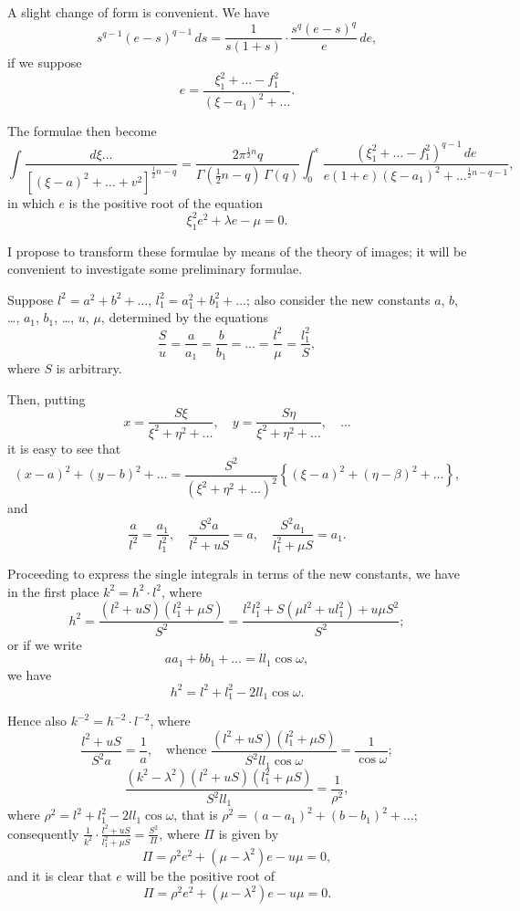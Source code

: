 \documentclass[11pt,a4paper]{book}
\begin{document}
A slight change of form is convenient. We have
\[s^{q-1}(e-s)^{q-1}\,ds = \frac{1}{s(1+s)} \cdot \frac{s^q(e-s)^q}{e}\,de,\]
if we suppose
\[e = \frac{\xi_1^2 + \ldots - f_1^2}{(\xi-a_1)^2 + \ldots}.\]

The formulae then become
\[\int \frac{d\xi \ldots}{[(\xi-a)^2 + \ldots + v^2]^{\frac{1}{2}n-q}} = \frac{2\pi^{\frac{1}{2}n}q}{\Gamma(\tfrac{1}{2}n-q)\,\Gamma(q)} \int_0^{\epsilon} \frac{(\xi_1^2 + \ldots - f_1^2)^{q-1}\,de}{e(1+e)(\xi-a_1)^2 + \ldots^{\frac{1}{2}n-q-1}},\]
in which $e$ is the positive root of the equation
\[\xi_1^2 e^2 + \lambda e - \mu = 0.\]

I propose to transform these formulae by means of the theory of images; it will be convenient to investigate some preliminary formulae.

Suppose $l^2 = a^2 + b^2 + \ldots$, $l_1^2 = a_1^2 + b_1^2 + \ldots$; also consider the new constants $a$, $b$, \ldots, $a_1$, $b_1$, \ldots, $u$, $\mu$, determined by the equations
\[\frac{S}{u} = \frac{a}{a_1} = \frac{b}{b_1} = \ldots = \frac{l^2}{\mu} = \frac{l_1^2}{S},\]
where $S$ is arbitrary.

Then, putting
\[x = \frac{S\xi}{\xi^2 + \eta^2 + \ldots}, \quad y = \frac{S\eta}{\xi^2 + \eta^2 + \ldots}, \quad \ldots\]
it is easy to see that
\[(x-a)^2 + (y-b)^2 + \ldots = \frac{S^2}{(\xi^2 + \eta^2 + \ldots)^2} \left\{ (\xi-a)^2 + (\eta-\beta)^2 + \ldots \right\},\]
and
\[\frac{a}{l^2} = \frac{a_1}{l_1^2}, \quad \frac{S^2a}{l^2 + uS} = a, \quad \frac{S^2a_1}{l_1^2 + \mu S} = a_1.\]

Proceeding to express the single integrals in terms of the new constants, we have in the first place $k^2 = h^2 \cdot l^2$, where
\[h^2 = \frac{(l^2 + uS)(l_1^2 + \mu S)}{S^2} = \frac{l^2l_1^2 + S(\mu l^2 + ul_1^2) + u\mu S^2}{S^2};\]
or if we write
\[aa_1 + bb_1 + \ldots = ll_1 \cos \omega,\]
we have
\[h^2 = l^2 + l_1^2 - 2ll_1 \cos \omega.\]

Hence also $k^{-2} = h^{-2} \cdot l^{-2}$, where
\[\frac{l^2 + uS}{S^2a} = \frac{1}{a}, \quad \text{whence } \frac{(l^2+uS)(l_1^2+\mu S)}{S^2ll_1 \cos \omega} = \frac{1}{\cos \omega};\]
\[\frac{(k^2-\lambda^2)(l^2+uS)(l_1^2+\mu S)}{S^2ll_1} = \frac{1}{\rho^2},\]
where $\rho^2 = l^2 + l_1^2 - 2ll_1 \cos \omega$, that is $\rho^2 = (a-a_1)^2 + (b-b_1)^2 + \ldots$; consequently $\frac{1}{k^2} \cdot \frac{l^2+uS}{l_1^2+\mu S} = \frac{S^2}{\Pi}$, where $\Pi$ is given by
\[\Pi = \rho^2 e^2 + (\mu - \lambda^2)e - u\mu = 0,\]
and it is clear that $e$ will be the positive root of
\[\Pi = \rho^2 e^2 + (\mu - \lambda^2)e - u\mu = 0.\]
\end{document}
